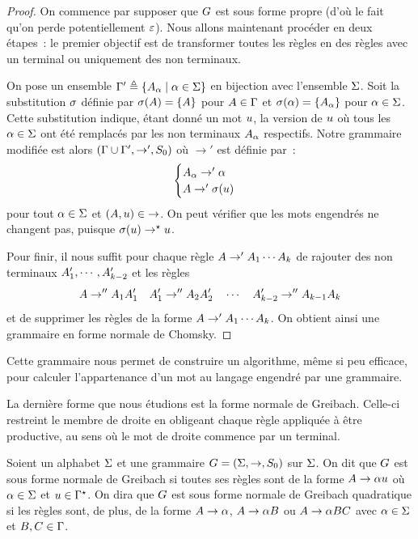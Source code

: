 \begin{proof}
  On commence par supposer que $G$ est sous forme propre (d'où le fait
  qu'on perde potentiellement $\varepsilon$). Nous allons maintenant procéder en deux
  étapes~: le premier objectif est de transformer toutes les règles en des
  règles avec un terminal ou uniquement des non terminaux.

  On pose un ensemble $\Gamma' \triangleq \left\{ A_{\alpha} \;\middle\vert\; \alpha \in \Sigma \right\}$ en
  bijection avec l'ensemble $\Sigma$. Soit la substitution $\sigma$ définie par
  $\sigma(A) = \{A\}$ pour $A \in \Gamma$ et
  $\sigma(\alpha) = \{A_{\alpha}\}$ pour $\alpha \in \Sigma$. Cette
  substitution indique, étant donné un mot $u$, la version de $u$ où
  tous les $\alpha \in \Sigma$ ont été remplacés par les non terminaux
  $A_{\alpha}$ respectifs.
  Notre grammaire modifiée est alors $(\Gamma\cup\Gamma',\to',S_{0})$ où $\to'$ est
  définie par~:
  \[\begin{cases}
  A_{\alpha} \to' \alpha\\
  A \to' \sigma(u)
  \end{cases}\]
  pour tout $\alpha \in \Sigma$ et $(A,u)\in \mathord{\to}$. On peut
  vérifier que les mots engendrés ne changent pas, puisque
  $\sigma(u)\to^{\mathord{\star}}u$.

  Pour finir, il nous suffit pour chaque règle $A \to' A_1\cdots A_k$ de
  rajouter des non terminaux $A'_1,\cdots,A'_{k-2}$ et les règles
  \[A \to'' A_1 A'_1\quad A'_1 \to'' A_2 A'_2 \quad\cdots
  \quad A'_{k-2} \to'' A_{k-1}A_k\]
  et de supprimer les règles de la forme $A \to' A_1\cdots A_k$. On
  obtient ainsi une grammaire en forme normale de Chomsky.
\end{proof}

\begin{remark}
  Cette grammaire nous permet de construire un algorithme, même si peu efficace,
  pour calculer l'appartenance d'un mot au langage engendré par une grammaire.
\end{remark}

La dernière forme que nous étudions est la forme normale de Greibach. Celle-ci
restreint le membre de droite en obligeant chaque règle appliquée à être
productive, au sens où le mot de droite commence par un terminal.

\begin{definition}
  Soient un alphabet $\Sigma$ et une grammaire $G=(\Sigma,\to,S_{0})$ sur
  $\Sigma$.
  On dit que $G$ est sous forme normale de Greibach si toutes ses règles
  sont de la forme $A \to \alpha u$ où $\alpha \in \Sigma$ et
  $u \in \Gamma^{\star}$. On dira que $G$ est sous forme normale de Greibach
  quadratique si les règles sont, de plus, de la forme $A \to \alpha$,
  $A \to \alpha B$ ou $A \to \alpha BC$ avec
  $\alpha\in\Sigma$ et $B,C \in \Gamma$.
\end{definition}

